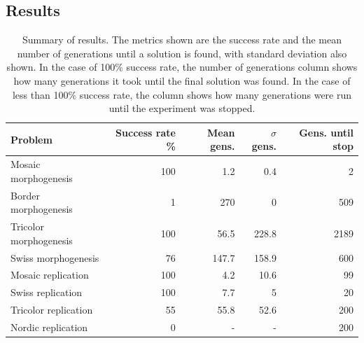 \subsection{Results}
\begin{table}[h]
    \centering
    \caption[Summary of results of morphology experiments]{
Summary of results.
The metrics shown are the success rate and the mean number of generations until a solution is found, with standard deviation also shown.
In the case of 100\% success rate, the number of generations column shows how many generations it took until the final solution was found.
In the case of less than 100\% success rate, the column shows how many generations were run until the experiment was stopped.
}
\begin{tabular}{lrrrr}
\hline
 Problem              &   Success rate \% &   Mean gens. &   $\sigma$ gens. &   Gens. until stop \\
\hline
Mosaic morphogenesis      &              100 &                1.2 &                 0.4 &                        2 \\
Border morphogenesis      &                1 &              270   &                 0   &                      509 \\
Tricolor morphogenesis    &              100 &               56.5 &               228.8 &                     2189 \\
Swiss morphogenesis       &               76 &              147.7 &               158.9 &                      600 \\
Mosaic replication        &              100 &                4.2 &                10.6 &                       99 \\
Swiss replication         &              100 &                7.7 &                 5   &                       20 \\
Tricolor replication      &               55 &               55.8 &                52.6 &                      200 \\
Nordic replication        &               0  &                  - &                   - &                      200 \\
\hline
\end{tabular}
\label{tbl:results}
\end{table}

